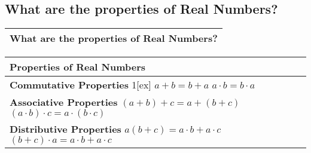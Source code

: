 \subsection{What are the properties of Real Numbers?}

\begin{small}
\begin{tabularx}{1\textwidth}{
    p{}
}
\toprule
\textbf{What are the properties of Real Numbers?} \\
\midrule
\end{tabularx}
\end{small}

\begin{small}
    \begin{tabularx}{1\textwidth}{
            p{}
        }
        \toprule
        Properties of Real Numbers \\
        \midrule


\makecell[l]{
    \textbf{Commutative Properties} \\ 1[ex]
    $a + b = b + a$ \\ 
    $a \cdot b = b \cdot a$
} 
\\
\midrule

\makecell[l]{
    \textbf{Associative Properties} \\[1ex] 
    $(a + b) + c = a + (b + c)$ \\ 
    $(a \cdot b) \cdot c = a \cdot (b \cdot c)$
} 
\\

\midrule

\makecell[l]{
    \textbf{Distributive Properties} \\[1ex] 
    $a(b + c) = a \cdot b + a \cdot c$ \\ 
    $(b + c) \cdot a = a \cdot b + a \cdot c$
} 
\\  

\bottomrule
\end{tabularx}
\end{small}
